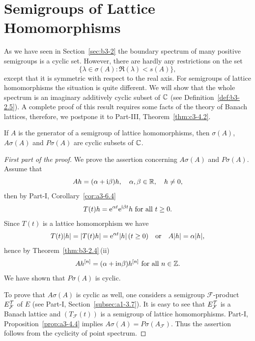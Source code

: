 \section{Semigroups of Lattice Homomorphisms}\label{sec:b3-4}%
As we have seen in Section~\ref{sec:b3-2} the boundary spectrum of many positive semigroups is a cyclic set.
However, there are hardly any restrictions on the set 
\[
\{\lambda \in \sigma(A) \colon \Re(\lambda) < s(A)\} , 
\] 
except that it is symmetric with respect to the real axis.
For semigroups of lattice homomorphisms the situation is quite different.
We will show that the whole spectrum is an imaginary additively cyclic 
subset of\/ $\mathbb{C}$ (see Definition~\ref{def:b3-2.5}).
A complete proof of this result requires some facts of the theory of Banach lattices, therefore, we postpone it to Part-III, Theorem~\ref{thm:c3-4.2}.
\begin{theorem}\label{thm:b3-4.1}
If\/ $A$ is the generator of a semigroup of lattice homomorphisms, then $\sigma(A)$, $A\sigma(A)$ and $P\sigma(A)$ are cyclic subsets of\/ $\mathbb{C}$.
\end{theorem}
\begin{proof}[First part of the proof]
We prove the assertion concerning $A\sigma(A)$ and $P\sigma(A)$.
	Assume that 
    \[
    Ah = (\alpha + \mathrm{i}\beta)h, \quad \alpha,\beta \in \mathbb{R}, \quad h \neq 0 , 
    \]
    then by Part-I, Corollary~\ref{cor:a3-6.4}
    \[
    T(t)h = \eu^{\alpha t}\eu^{\im\beta  t}h \text{ for all } t \geq 0 .
    \]
	Since $T(t)$ is a lattice homomorphism we have 
    \[
    T(t)|h| = |T(t)h| = \eu^{\alpha t}|h|\, (t \geq 0)
    \quad\text{or}\quad A|h| = \alpha|h| , 
    \] 
    hence by Theorem~\ref{thm:b3-2.4}\,(ii)
    \[
    Ah^{[n]} = (\alpha + \mathrm{i} n\beta)h^{[n]} \text{ for all } n \in \mathbb{Z} .
    \]
	We have shown that $P\sigma(A)$ is cyclic.
	
	To prove that $A\sigma(A)$ is cyclic as well, one considers a semigroup $\mathcal{F}$-product $E_{\mathcal{F}}^{\mathcal{T}}$ of\/ $E$ 
	(see Part-I, Section~\ref{subsec:a1-3.7}).
	It is easy to see that $E_{\mathcal{F}}^{\mathcal{T}}$ is a Banach lattice 
	and $(T_{\mathcal{F}}(t))$ is a semigroup of lattice homomorphisms.
	Part-I, Proposition~\ref{prop:a3-4.4} implies $A\sigma(A) = P\sigma(A_{\mathcal{F}})$.
	Thus the assertion follows from the cyclicity of point spectrum.
\end{proof}
